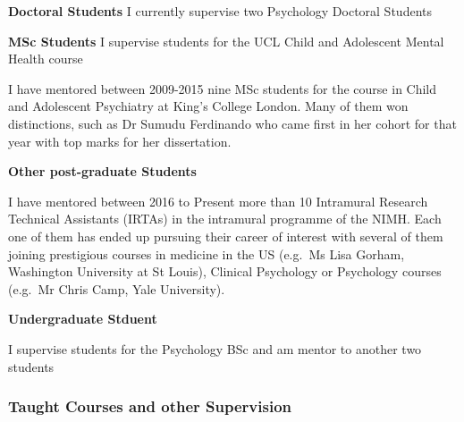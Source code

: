 \documentclass[
]{article}
\begin{document}
\textbf{Doctoral Students} I currently supervise two Psychology Doctoral
Students

\textbf{MSc Students} I supervise students for the UCL Child and
Adolescent Mental Health course

I have mentored between 2009-2015 nine MSc students for the course in
Child and Adolescent Psychiatry at King's College London. Many of them
won distinctions, such as Dr Sumudu Ferdinando who came first in her
cohort for that year with top marks for her dissertation.

\textbf{Other post-graduate Students}

I have mentored between 2016 to Present more than 10 Intramural Research
Technical Assistants (IRTAs) in the intramural programme of the NIMH.
Each one of them has ended up pursuing their career of interest with
several of them joining prestigious courses in medicine in the US
(e.g.~Ms Lisa Gorham, Washington University at St Louis), Clinical
Psychology or Psychology courses (e.g.~Mr Chris Camp, Yale University).

\textbf{Undergraduate Stduent}

I supervise students for the Psychology BSc and am mentor to another two
students

\hypertarget{taught-courses-and-other-supervision}{%
\subsubsection{Taught Courses and other
Supervision}\label{taught-courses-and-other-supervision}}
\end{document}
